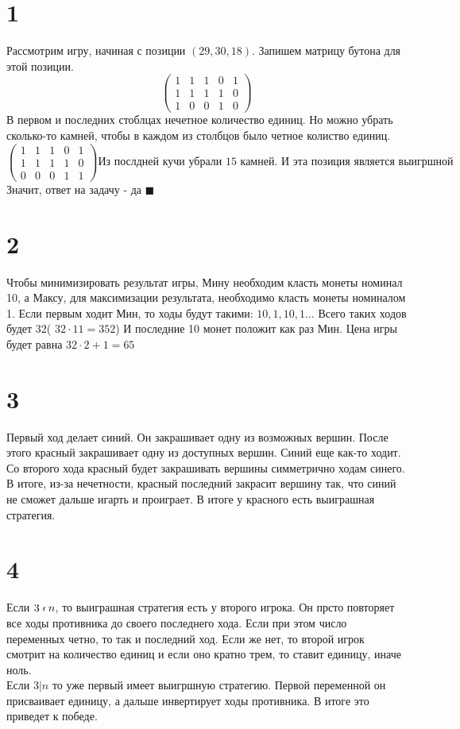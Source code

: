 

	\section*{1}
	Рассмотрим игру, начиная с позиции $(29, 30, 18)$. Запишем матрицу бутона для этой позиции. \\
	$$\begin{pmatrix}
		1 & 1 & 1 & 0 & 1 \\
		1  & 1 & 1 & 1 & 0 \\
		1 & 0 & 0 & 1 & 0
	\end{pmatrix}$$
	В первом и последних стоблцах нечетное количество единиц. Но можно убрать сколько-то камней, чтобы в каждом из столбцов было четное колиство единиц. 
		$$\begin{pmatrix}
		1 & 1 & 1 & 0 & 1 \\
		1  & 1 & 1 & 1 & 0 \\
		0 & 0 & 0 & 1 & 1
	\end{pmatrix} \text{Из послдней кучи убрали 15 камней. И эта позиция является выигршной}$$
	Значит, ответ на задачу - да $\blacksquare$
	\section*{2}
	Чтобы минимизировать результат игры, Мину необходим класть монеты номинал 10, а Максу, для максимизации результата, необходимо класть монеты номиналом 1. Если первым ходит Мин, то ходы будут такими: $10, 1 ,10, 1 \dots$ Всего таких ходов будет 32( $32\cdot11 = 352$) И последние 10 монет положит как раз Мин. Цена игры будет равна $32\cdot2 + 1 = 65$
	\section*{3}
	Первый ход делает синий. Он закрашивает одну из возможных вершин. После этого красный закрашивает одну из доступных вершин. Синий еще как-то ходит. Со второго хода красный будет закрашивать вершины симметрично ходам синего. В итоге, из-за нечетности, красный последний закрасит вершину так, что синий не сможет дальше игарть и проиграет. В итоге у красного есть выиграшная стратегия.
	\section*{4}
	Если $3\nshortmid n  $, то выиграшная стратегия есть у второго игрока. Он прсто повторяет все ходы противника до своего последнего хода. Если при этом число переменных четно, то так и последний ход. Если же нет, то второй игрок смотрит на количество единиц и если оно кратно трем, то ставит единицу, иначе ноль.  \\
	Если $3|n $ то уже первый имеет выигршную стратегию. Первой переменной он присваивает единицу, а дальше инвертирует ходы противника. В итоге это приведет к победе. 
